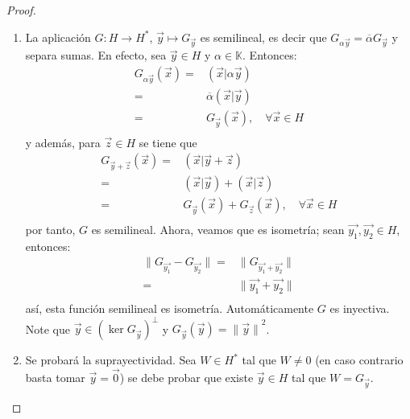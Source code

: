 \documentclass[12pt]{report}
\theoremstyle{largebreak}
\newcommand\cf[3]{\ensuremath{#1:#2\rightarrow#3}}
\newcommand\norm[1]{\ensuremath{\|#1\|}}
\newcommand\pint[2]{\ensuremath{\left(#1\big| #2\right)}}
\newcommand\conj[1]{\ensuremath{\overline{#1}}}
\begin{document}
\begin{proof}
\begin{enumerate}
            \item La aplicación $\cf{G}{H}{H^*}$, $\vec{y}\mapsto G_{\vec{y}}$ es semilineal, es decir que $G_{\alpha\vec{y}}=\conj{\alpha}G_{\vec{y}}$ y separa sumas. En efecto, sea $\vec{y}\in H$ y $\alpha\in\mathbb{K}$. Entonces:
            \begin{equation*}
                \begin{split}
                    G_{\alpha\vec{y}}(\vec{x})=&\pint{\vec{x}}{\alpha\vec{y}}\\
                    =&\conj{\alpha} \pint{\vec{x}}{\vec{y}}\\
                    =& G_{\vec{y}}(\vec{x}),\quad\forall\vec{x}\in H \\
                \end{split}
            \end{equation*}
            y además, para $\vec{z}\in H$ se tiene que
            \begin{equation*}
                \begin{split}
                    G_{\vec{y}+\vec{z}}(\vec{x})=&\pint{\vec{x}}{\vec{y}+\vec{z}} \\
                    =&\pint{\vec{x}}{\vec{y}}+\pint{\vec{x}}{\vec{z}} \\
                    =& G_{\vec{y}}(\vec{x})+G_{\vec{z}}(\vec{x}),\quad\forall\vec{x}\in H \\
                \end{split}
            \end{equation*}
            por tanto, $G$ es semilineal. Ahora, veamos que es isometría; sean $\vec{y_1},\vec{y_2}\in H$, entonces:
            \begin{equation*}
                \begin{split}
                    \norm{G_{\vec{y_1}}-G_{\vec{y_2}}}=&\norm{G_{\vec{y_1}+\vec{y_2}}} \\
                    =& \norm{\vec{y_1}+\vec{y_2}}\\
                \end{split}
            \end{equation*}
            así, esta función semilineal es isometría. Automáticamente $G$ es inyectiva. Note que $\vec{y}\in\left(\ker G_{\vec{y}} \right)^\perp$ y $G_{\vec{y}}(\vec{y})=\norm{\vec{y}}^2$.

            \item Se probará la suprayectividad. Sea $W\in H^*$ tal que $W\neq 0$ (en caso contrario basta tomar $\vec{y}=\vec{0}$) se debe probar que existe $\vec{y}\in H$ tal que $W=G_{\vec{y}}$. 
            

\end{enumerate}
\end{proof}
\end{document}
